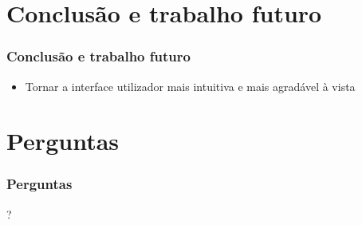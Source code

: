 \documentclass{beamer}
\begin{document}
\section{Conclusão e trabalho futuro}
\begin{frame} \frametitle{Conclusão e trabalho futuro}
\begin{itemize} 
\item Tornar a interface utilizador mais intuitiva e mais agradável à vista
\end{itemize}
\end{frame}


\section*{Perguntas}
\begin{frame} \frametitle{Perguntas}
\begin{center}\huge{?}\end{center}
\end{frame}
\end{document}
